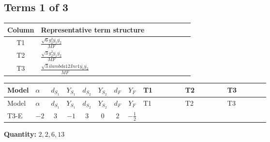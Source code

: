 \documentclass[8pt]{article}
\begin{document}
\begin{landscape}
\subsection*{Terms 1 of 3}
\begin{center}
\begin{tabular}{@{}c >{\raggedright\arraybackslash}p{0.82\linewidth}@{}}
\toprule
Column & Representative term structure \\
\midrule
T1 & \(\displaystyle \frac{\sqrt{6} g_{2}^{2} \overline{y_{1}} \overline{y_{2}}}{MF}\) \\
\midrule
T2 & \(\displaystyle \frac{\sqrt{3} g_{2}^{2} \overline{y_{1}} \overline{y_{2}}}{MF}\) \\
\midrule
T3 & \(\displaystyle \frac{\sqrt{3} i lambda12Inv1 \overline{y_{1}} \overline{y_{2}}}{MF}\) \\
\midrule
\bottomrule
\end{tabular}
\end{center}
\smallskip
\tiny
\begin{longtable}{@{}llcccccc >{\raggedright\arraybackslash}p{0.21\linewidth} >{\raggedright\arraybackslash}p{0.21\linewidth} >{\raggedright\arraybackslash}p{0.21\linewidth}@{}}
\toprule
Model & $\alpha$ & $d_{S_1}$ & $Y_{S_1}$ & $d_{S_2}$ & $Y_{S_2}$ & $d_F$ & $Y_F$ & T1 & T2 & T3 \\
\midrule
\endfirsthead
\toprule
Model & $\alpha$ & $d_{S_1}$ & $Y_{S_1}$ & $d_{S_2}$ & $Y_{S_2}$ & $d_F$ & $Y_F$ & T1 & T2 & T3 \\
\midrule
\endhead
T3-E & $-2$ & $3$ & $-1$ & $3$ & $0$ & $2$ & $-\frac{1}{2}$ & \scriptsize\adjustbox{max width=\linewidth}{$\begin{gathered} \frac{\sqrt{6} g_{2}^{2} \overline{y_{1}} \overline{y_{2}}}{3 MF}\end{gathered}$} & \scriptsize\adjustbox{max width=\linewidth}{$\begin{gathered} \frac{\sqrt{3} g_{2}^{2} \overline{y_{1}} \overline{y_{2}}}{6 MF}\end{gathered}$} & \scriptsize\adjustbox{max width=\linewidth}{$\begin{gathered} - \frac{\sqrt{3} i lambda12Inv1 \overline{y_{1}} \overline{y_{2}}}{6 MF}\end{gathered}$} \\
\midrule
\bottomrule
\end{longtable}
\clearpage
\noindent\textbf{Quantity: }$\mathrm{2,2,6,13}$\par\smallskip

\end{landscape}
\end{document}

